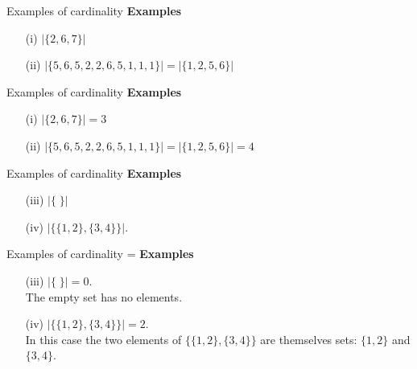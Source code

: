 \documentclass[]{article}
\begin{document}

{Examples of cardinality}
\LARGE
\vspace{-1cm}
\textbf{Examples}
\begin{itemize}
\item[(i)] $|\{2,6,7\}| $
\vspace{2cm}
\item[(ii)] $|\{5,6,5,2,2,6,5,1,1,1\}| = |\{1,2,5,6\}| $
\end{itemize}



{Examples of cardinality}
\LARGE
\vspace{-1cm}
\textbf{Examples}
\begin{itemize}
\item[(i)] $|\{2,6,7\}| = 3$
\vspace{2cm}
\item[(ii)] $|\{5,6,5,2,2,6,5,1,1,1\}| = |\{1,2,5,6\}| = 4$
\end{itemize}


{Examples of cardinality}
\LARGE
\vspace{-1cm}
\textbf{Examples}
\begin{itemize}
\item[(iii)] $|\{ \; \}| $
\vspace{2cm}
\item[(iv)] $|\{\{1,2\},\{3,4\}\}| $.
\end{itemize}



{Examples of cardinality}
=
\textbf{Examples}
\begin{itemize}
\item[(iii)] $|\{ \; \}| = 0$. \\ The empty set has no elements.
\vspace{0.4cm} 
\item[(iv)] $|\{\{1,2\},\{3,4\}\}| = 2$. \\ \vspace{0.4cm} In this case the two elements of $\{\{1,2\},\{3,4\}\}$ are themselves sets: $\{1,2\}$ and $\{3,4\}$.
\end{itemize}
\end{document}
